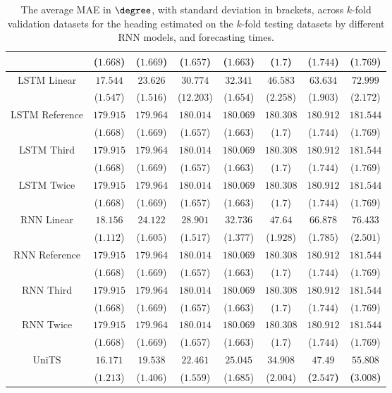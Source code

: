 \begin{table}[!ht]
{\begin{tabular}{|c|c|c|c|c|c|c|c|}
			 & ($1.668$) & ($1.669$) & ($1.657$) & ($1.663$) & ($1.7$) & ($1.744$) & ($1.769$) \\ \hline
			\multirow{2}{*}{LSTM Linear} & $17.544$ & $23.626$ & $30.774$ & $32.341$ & $46.583$ & $63.634$ & $72.999$ \\
			 & ($1.547$) & ($1.516$) & ($12.203$) & ($1.654$) & ($2.258$) & ($1.903$) & ($2.172$) \\ \hline
			\multirow{2}{*}{LSTM Reference} & $179.915$ & $179.964$ & $180.014$ & $180.069$ & $180.308$ & $180.912$ & $181.544$ \\
			 & ($1.668$) & ($1.669$) & ($1.657$) & ($1.663$) & ($1.7$) & ($1.744$) & ($1.769$) \\ \hline
			\multirow{2}{*}{LSTM Third} & $179.915$ & $179.964$ & $180.014$ & $180.069$ & $180.308$ & $180.912$ & $181.544$ \\
			 & ($1.668$) & ($1.669$) & ($1.657$) & ($1.663$) & ($1.7$) & ($1.744$) & ($1.769$) \\ \hline
			\multirow{2}{*}{LSTM Twice} & $179.915$ & $179.964$ & $180.014$ & $180.069$ & $180.308$ & $180.912$ & $181.544$ \\
			 & ($1.668$) & ($1.669$) & ($1.657$) & ($1.663$) & ($1.7$) & ($1.744$) & ($1.769$) \\ \hline
			\multirow{2}{*}{RNN Linear} & $18.156$ & $24.122$ & $28.901$ & $32.736$ & $47.64$ & $66.878$ & $76.433$ \\
			 & ($1.112$) & ($1.605$) & ($1.517$) & ($1.377$) & ($1.928$) & ($1.785$) & ($2.501$) \\ \hline
			\multirow{2}{*}{RNN Reference} & $179.915$ & $179.964$ & $180.014$ & $180.069$ & $180.308$ & $180.912$ & $181.544$ \\
			 & ($1.668$) & ($1.669$) & ($1.657$) & ($1.663$) & ($1.7$) & ($1.744$) & ($1.769$) \\ \hline
			\multirow{2}{*}{RNN Third} & $179.915$ & $179.964$ & $180.014$ & $180.069$ & $180.308$ & $180.912$ & $181.544$ \\
			 & ($1.668$) & ($1.669$) & ($1.657$) & ($1.663$) & ($1.7$) & ($1.744$) & ($1.769$) \\ \hline
			\multirow{2}{*}{RNN Twice} & $179.915$ & $179.964$ & $180.014$ & $180.069$ & $180.308$ & $180.912$ & $181.544$ \\
			 & ($1.668$) & ($1.669$) & ($1.657$) & ($1.663$) & ($1.7$) & ($1.744$) & ($1.769$) \\ \hline
			\multirow{2}{*}{UniTS} & $16.171$ & $19.538$ & $22.461$ & $25.045$ & $34.908$ & $\mathbf{47.49}$ & $\mathbf{55.808}$ \\
			 & ($1.213$) & ($1.406$) & ($1.559$) & ($1.685$) & ($2.004$) & \textbf{(}$\mathbf{2.547}$\textbf{)} & \textbf{(}$\mathbf{3.008}$\textbf{)} \\ \hline
		\end{tabular}
	}
	\caption{The average MAE in $\degree$, with standard deviation in brackets, across $k$-fold validation datasets for the heading estimated on the $k$-fold testing datasets by different RNN models, and forecasting times.}
	\label{tab:all_direction_MAE}
\end{table}

